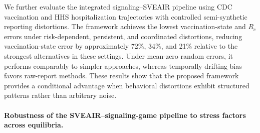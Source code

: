 \documentclass[sigconf,review]{acmart}
\begin{document}
We further evaluate the integrated signaling--SVEAIR pipeline using CDC
vaccination and HHS hospitalization trajectories with controlled
semi-synthetic reporting distortions. The framework achieves the lowest
vaccination-state and $R_c$ errors under risk-dependent, persistent, and coordinated distortions, reducing vaccination-state error by approximately 72\%, 34\%, and 21\% relative to the strongest alternatives in these settings. Under mean-zero random errors, it performs comparably to simpler approaches, whereas temporally drifting bias favors raw-report methods. These results show that the proposed framework provides a conditional advantage when behavioral distortions exhibit structured patterns rather than arbitrary noise.



\paragraph{Robustness of the SVEAIR–signaling-game pipeline to stress factors across equilibria.}
\end{document}
